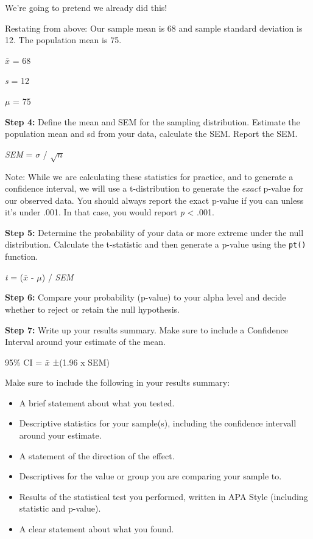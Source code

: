 \documentclass[
  letterpaper,
  DIV=11,
  numbers=noendperiod]{scrartcl}
\providecommand{\tightlist}{%
  \setlength{\itemsep}{0pt}\setlength{\parskip}{0pt}}\usepackage{longtable,booktabs,array}
\begin{document}
We're going to pretend we already did this!

Restating from above: Our sample mean is 68 and sample standard
deviation is 12. The population mean is 75.

\(\bar{x}\) = 68

\emph{s} = 12

\(\mu\) = 75

\textbf{Step 4:} Define the mean and SEM for the sampling distribution.
Estimate the population mean and sd from your data, calculate the SEM.
Report the SEM.

\emph{SEM} = \(\sigma\) / \(\sqrt{n}\)

\begin{tcolorbox}[enhanced jigsaw, opacityback=0, colbacktitle=quarto-callout-note-color!10!white, colback=white, toptitle=1mm, title=\textcolor{quarto-callout-note-color}{\faInfo}\hspace{0.5em}{Note}, left=2mm, colframe=quarto-callout-note-color-frame, coltitle=black, bottomtitle=1mm, titlerule=0mm, leftrule=.75mm, toprule=.15mm, rightrule=.15mm, bottomrule=.15mm, arc=.35mm, opacitybacktitle=0.6, breakable]

Note: While we are calculating these statistics for practice, and to
generate a confidence interval, we will use a t-distribution to generate
the \emph{exact} p-value for our observed data. You should always report
the exact p-value if you can unless it's under .001. In that case, you
would report \emph{p} \textless{} .001.

\end{tcolorbox}

\textbf{Step 5:} Determine the probability of your data or more extreme
under the null distribution. Calculate the t-statistic and then generate
a p-value using the \texttt{pt()} function.

\emph{t} = (\(\bar{x}\) - \(\mu\)) / \emph{SEM}

\textbf{Step 6:} Compare your probability (p-value) to your alpha level
and decide whether to reject or retain the null hypothesis.

\textbf{Step 7:} Write up your results summary. Make sure to include a
Confidence Interval around your estimate of the mean.

95\% CI = \(\bar{x}\) ±(1.96 x SEM)

Make sure to include the following in your results summary:

\begin{itemize}
\tightlist
\item
  A brief statement about what you tested.
\item
  Descriptive statistics for your sample(s), including the confidence
  intervall around your estimate.
\item
  A statement of the direction of the effect.
\item
  Descriptives for the value or group you are comparing your sample to.
\item
  Results of the statistical test you performed, written in APA Style
  (including statistic and p-value).
\item
  A clear statement about what you found.
\end{itemize}
\end{document}
